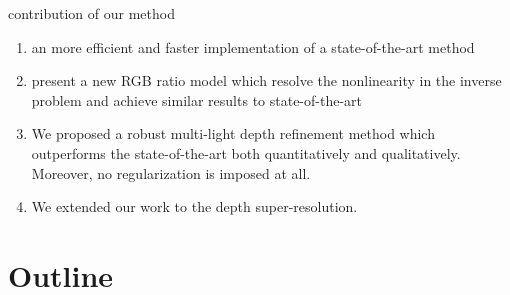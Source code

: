 contribution of our method
\begin{enumerate}
    \item an more efficient and faster implementation of a state-of-the-art method
    \item present a new RGB ratio model which resolve the nonlinearity in the inverse problem and achieve similar results to state-of-the-art
    \item We proposed a robust multi-light depth refinement method which outperforms the state-of-the-art both quantitatively and qualitatively. Moreover, no regularization is imposed at all.
    \item We extended our work to the depth super-resolution.
\end{enumerate}


\section{Outline}